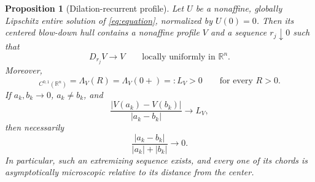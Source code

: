 \documentclass[11pt,reqno]{amsart}
\numberwithin{equation}{section}
\newcommand{\R}{\mathbb R}
\newtheorem{proposition}[theorem]{Proposition}
\theoremstyle{remark}
\begin{document}
\begin{proposition}[Dilation-recurrent profile]
\label{prop:dilation-recurrent-cascade}
Let $U$ be a nonaffine,
globally Lipschitz entire solution of \eqref{eq:equation}, normalized by
$U(0)=0$.  Then its centered blow-down hull contains a nonaffine profile
$V$ and a sequence $r_j\downarrow0$ such that
\begin{equation}
 D_{r_j}V\longrightarrow V
 \qquad\text{locally uniformly in }\R^n.
 \label{eq:dilation-recurrence}
\end{equation}
Moreover,
\begin{equation}
 [V]_{C^{0,1}(\R^n)}
 =\Lambda_V(R)=\Lambda_V(0+)=:L_V>0
 \qquad\text{for every }R>0.
 \label{eq:all-centered-scales-full-slope}
\end{equation}
If $a_k,b_k\to0$, $a_k\ne b_k$, and
\begin{equation}
 \frac{|V(a_k)-V(b_k)|}{|a_k-b_k|}\longrightarrow L_V,
 \label{eq:centered-extremizing-chords}
\end{equation}
then necessarily
\begin{equation}
 \frac{|a_k-b_k|}{|a_k|+|b_k|}\longrightarrow0.
 \label{eq:centered-microscopic-ratio}
\end{equation}
In particular, such an extremizing sequence exists, and every one of its
chords is asymptotically microscopic relative to its distance from the
center.
\end{proposition}
\end{document}
